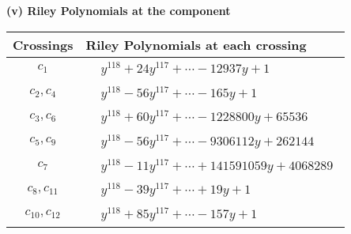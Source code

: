 \documentclass[1p]{elsarticle_modified}
\theoremstyle{definition}
\begin{document}
\flushleft \textbf{(v) Riley Polynomials at the component}\newline \\
\begin{tabular}{m{50pt}|m{274pt}}
Crossings & \hspace{64pt}Riley Polynomials at each crossing \\
\hline $$\begin{aligned}c_{1}\end{aligned}$$&$\begin{aligned}
&y^{118}+24 y^{117}+\cdots-12937 y+1
\end{aligned}$\\
\hline $$\begin{aligned}c_{2},c_{4}\end{aligned}$$&$\begin{aligned}
&y^{118}-56 y^{117}+\cdots-165 y+1
\end{aligned}$\\
\hline $$\begin{aligned}c_{3},c_{6}\end{aligned}$$&$\begin{aligned}
&y^{118}+60 y^{117}+\cdots-1228800 y+65536
\end{aligned}$\\
\hline $$\begin{aligned}c_{5},c_{9}\end{aligned}$$&$\begin{aligned}
&y^{118}-56 y^{117}+\cdots-9306112 y+262144
\end{aligned}$\\
\hline $$\begin{aligned}c_{7}\end{aligned}$$&$\begin{aligned}
&y^{118}-11 y^{117}+\cdots+141591059 y+4068289
\end{aligned}$\\
\hline $$\begin{aligned}c_{8},c_{11}\end{aligned}$$&$\begin{aligned}
&y^{118}-39 y^{117}+\cdots+19 y+1
\end{aligned}$\\
\hline $$\begin{aligned}c_{10},c_{12}\end{aligned}$$&$\begin{aligned}
&y^{118}+85 y^{117}+\cdots-157 y+1
\end{aligned}$\\
\hline
\end{tabular}\\~\\
\end{document}
